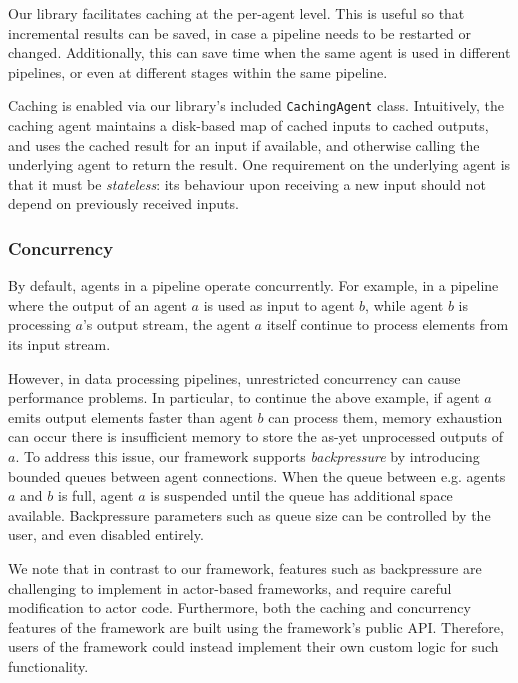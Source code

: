 Our library facilitates caching at the per-agent level. This is useful so that
incremental results can be saved, in case a pipeline needs to be restarted or
changed. Additionally, this can save time when the same agent is used in
different pipelines, or even at different stages within the same pipeline.

Caching is enabled via our library's included \texttt{CachingAgent} class.
Intuitively, the caching agent maintains a disk-based map of cached inputs to
cached outputs, and uses the cached result for an input if available, and
otherwise calling the underlying agent to return the result. One requirement on
the underlying agent is that it must be \emph{stateless}: its behaviour upon
receiving a new input should not depend on previously received inputs.

\subsubsection{Concurrency}

By default, agents in a pipeline operate concurrently. For example, in a
pipeline where the output of an agent $a$ is used as input to agent $b$, while
agent $b$ is processing $a$'s output stream, the agent $a$ itself continue to
process elements from its input stream.

However, in data processing pipelines, unrestricted concurrency can cause
performance problems. In particular, to continue the above example, if agent $a$
emits output elements faster than agent $b$ can process them, memory exhaustion
can occur there is insufficient memory to store the as-yet unprocessed outputs
of $a$. To address this issue, our framework supports \emph{backpressure} by
introducing bounded queues between agent connections. When the queue between
e.g. agents $a$ and $b$ is full, agent $a$ is suspended until the queue has
additional space available. Backpressure parameters such as queue size can be
controlled by the user, and even disabled entirely.

We note that in contrast to our framework, features such as backpressure are
challenging to implement in actor-based frameworks, and require careful
modification to actor code. Furthermore, both the caching and concurrency
features of the framework are built using the framework's public API. Therefore,
users of the framework could instead implement their own custom logic for such
functionality.
